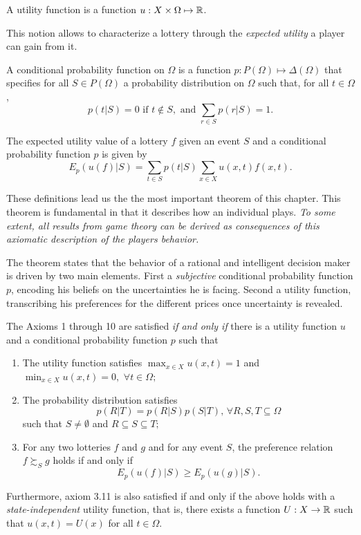 \begin{definition}
A utility function is a function $u : X \times \Omega \mapsto \mathbb{R}$.
\end{definition} 

This notion allows to characterize a lottery through the \emph{expected utility} a player can gain from it.

\begin{definition}
A conditional probability function on $\Omega$ is a function $p : P(\Omega) \mapsto \Delta(\Omega)$ that specifies for all $S \in P(\Omega)$ a probability distribution on $\Omega$ such that, for all $t \in \Omega$, 
$$ p(t|S) =  0 \text{ if } t \not \in S, \text{ and } \sum_{r \in S} p(r| S) = 1.$$
\end{definition}


\begin{definition}
The expected utility value of a lottery $f$ given an event $S$ and a conditional probability function $p$ is given by
$$ E_p(u(f)|S) = \sum_{t \in S} p(t|S) \sum_{x \in X} u(x,t) f(x,t).$$
\end{definition}

These definitions lead us the the most important theorem of this chapter. This theorem is fundamental in that it describes how an individual plays.  \emph{To some extent, all results from game theory can be derived as consequences of this axiomatic description of the players behavior.
}

The theorem states that the behavior of a rational and intelligent decision maker is driven by two main elements. First a \emph{subjective} conditional probability function $p$, encoding his beliefs on the uncertainties he is facing. Second a utility function, transcribing his preferences for the different prices once uncertainty is revealed.

\begin{theorem}
The Axioms 1 through 10 are satisfied \emph{if and only if} there is a utility function $u$ and a conditional probability function $p$ such that 
\begin{enumerate}
\item The utility function satisfies $\max_{x \in X} u(x,t) = 1$ and $\min_{x \in X} u(x,t) =0,$  $\forall t \in \Omega;$
\label{c1}
\item The probability distribution satisfies $$p(R|T) = p(R|S)p(S|T), \,  \forall R, S , T \subseteq \Omega$$ such that $S \neq \emptyset$ and 
$ R \subseteq S \subseteq T; $
\label{c2}
\item For any two lotteries $f$ and $g$ and for any event $S$, the preference relation $f \succsim_S g$ holds if and only if
$$ E_p(u(f) | S) \geq E_p(u(g) | S).$$
\label{c3}
\end{enumerate}
Furthermore, axiom 3.11 is also satisfied if and only if the above holds with a \emph{state-independent} utility function, that is, 
there exists a function $U : X \rightarrow \mathbb{R}$ such that 
$u(x,t) = U(x)$ for all $t \in \Omega$.
\label{ch1:utility-maximization}
\end{theorem}


